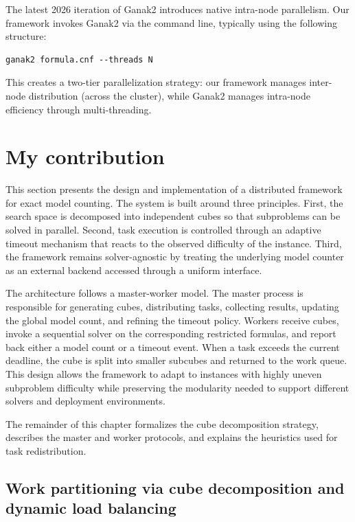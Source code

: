 \documentclass{report}
\begin{document}
The latest 2026 iteration of Ganak2 introduces native intra-node parallelism. 
Our framework invokes Ganak2 via the command line, typically using the following structure:
\vspace{-1em}
\begin{verbatim}
ganak2 formula.cnf --threads N
\end{verbatim}
\vspace{-1em}
This creates a two-tier parallelization strategy: our framework manages inter-node distribution (across the cluster), 
while Ganak2 manages intra-node efficiency through multi-threading.

\chapter{My contribution}
This section presents the design and implementation of a distributed framework for exact model counting. 
The system is built around three principles. First, the search space is decomposed into 
independent cubes so that subproblems can be solved in parallel. Second, task execution is controlled 
through an adaptive timeout mechanism that reacts to the observed difficulty of the instance. 
Third, the framework remains solver-agnostic by treating the underlying model counter as an 
external backend accessed through a uniform interface.

The architecture follows a master-worker model. The master process is responsible 
for generating cubes, distributing tasks, collecting results, updating the global model count, 
and refining the timeout policy. Workers receive cubes, invoke a sequential solver on 
the corresponding restricted formulas, and report back either a model count or a timeout event. 
When a task exceeds the current deadline, the cube is split into smaller subcubes and returned 
to the work queue. This design allows the framework to adapt to instances with highly uneven 
subproblem difficulty while preserving the modularity needed to support different solvers and deployment environments.

The remainder of this chapter formalizes the cube decomposition strategy, 
describes the master and worker protocols, and explains the heuristics used for task redistribution.
\section{Work partitioning via cube decomposition and dynamic load balancing}
\vspace{-1.5em}
\end{document}
